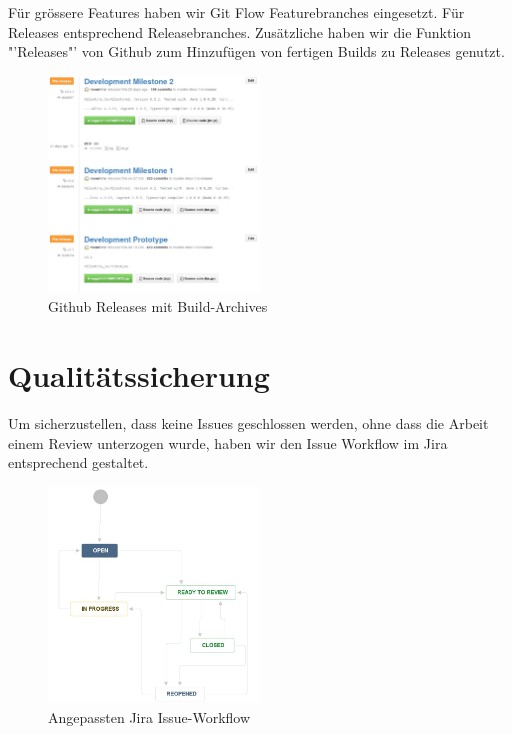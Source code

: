 		Für grössere Features haben wir Git Flow Featurebranches eingesetzt.
		Für Releases entsprechend Releasebranches.
		Zusätzliche haben wir die Funktion "'Releases"' von Github
		zum Hinzufügen von fertigen Builds zu Releases genutzt.
		
		\begin{figure}[H]
			\includegraphics[width=0.5\textwidth]{projectPlan/media/img/githubReleases.jpg}
			\centering
			\caption{Github Releases mit Build-Archives}
			\label{fig:githubReleases}
		\end{figure}
	
		
	\section{Qualitätssicherung}
		Um sicherzustellen, dass keine Issues geschlossen werden,
		ohne dass die Arbeit einem Review unterzogen wurde,
		haben wir den Issue Workflow im Jira entsprechend gestaltet.		
		
		\begin{figure}[H]
			\includegraphics[width=0.5\textwidth]{projectPlan/media/img/jiraIssueWorkflow.jpg}
			\centering
			\caption{Angepassten Jira Issue-Workflow}
			\label{fig:jiraIssueWorkflow}
		\end{figure}
		
